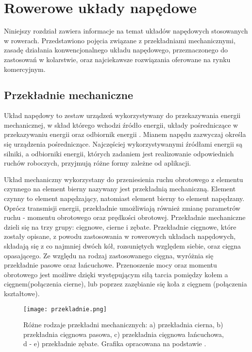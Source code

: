 \chapter{Rowerowe układy napędowe}

Niniejszy rozdział zawiera informacje na temat układów napędowych stosowanych w rowerach. Przedstawiono pojęcia związane z przekładniami mechanicznymi, zasadę działania konwencjonalnego układu napędowego, przeznaczonego do zastosowań w kolarstwie, oraz najciekawsze rozwiązania oferowane na rynku komercyjnym.
\section{Przekładnie mechaniczne}
Układ napędowy to zestaw urządzeń wykorzystywany do przekazywania energii mechanicznej, w skład którego wchodzi źródło energii, układy pośredniczące w przekazywaniu energii oraz odbiornik energii \cite{maszyny1}. Mianem napędu zazwyczaj określa się urządzenia pośredniczące. Najczęściej wykorzystywanymi źródłami energii są silniki, a odbiorniki energii, których zadaniem jest realizowanie odpowiednich ruchów roboczych, przyjmują różne formy zależne od aplikacji.

Układ mechaniczny wykorzystany do przeniesienia ruchu obrotowego z elementu czynnego na element bierny nazywany jest przekładnią mechaniczną. Element czynny to element napędzający, natomiast element bierny to element napędzany. Oprócz transmisji energii, przekładnie umożliwiają również zmianę parametrów ruchu - momentu obrotowego oraz prędkości obrotowej. Przekładnie mechaniczne dzieli się na trzy grupy: cięgnowe, cierne i zębate. Przekładnie cięgnowe, które zostały opisane, z powodu zastosowania w rowerowych układach napędowych, składają się z co najmniej dwóch kół, rozsuniętych względem siebie, oraz cięgna opasającego. Ze względu na rodzaj zastosowanego cięgna, wyróżnia się przekładnie pasowe oraz łańcuchowe. Przenoszenie mocy oraz momentu obrotowego jest możliwe dzięki występującym siłą tarcia pomiędzy kołem a cięgnem(połączenia cierne), lub poprzez zazębianie się koła z cięgnem (połączenia kształtowe).
\begin{figure}[h]
    \centering
    \texttt{[image: przekladnie.png]}
    \caption{Różne rodzaje przekładni mechanicznych: a) przekładnia cierna, b) przekładnia cięgnowa pasowa, c) przekładnia cięgnowa łańcuchowa, d - e) przekładnie zębate. Grafika opracowana na podstawie \cite{maszyny1}.}
    \label{fig:przekladnia}
\end{figure}

